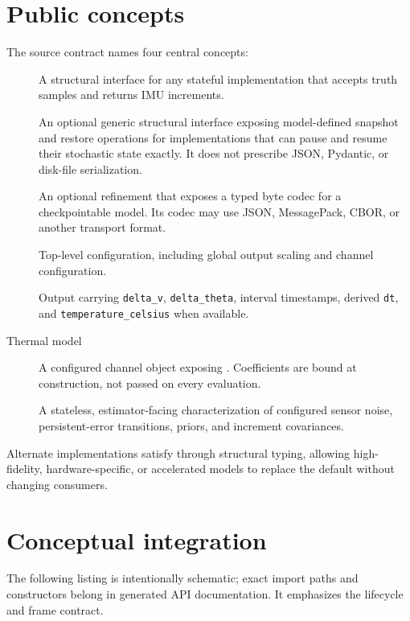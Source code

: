 \documentclass[11pt,oneside,headings=big]{scrreprt}
\newcommand{\field}[1]{\texttt{#1}}
\begin{document}
    \section{Public concepts}
    The source contract names four central concepts:
    \begin{description}
        \item[]
        A structural interface for any stateful implementation that accepts truth
        samples and returns IMU increments.
        \item[]
        An optional generic structural interface exposing model-defined snapshot and
        restore operations for implementations that can pause and resume their
        stochastic state exactly. It does not prescribe JSON, Pydantic, or disk-file serialization.
        \item[]
        An optional refinement that exposes a typed byte codec for a checkpointable
        model. Its codec may use JSON, MessagePack, CBOR, or another transport format.
        \item[]
        Top-level configuration, including global output scaling and channel
        configuration.
        \item[]
        Output carrying \field{delta\_v}, \field{delta\_theta}, interval timestamps,
        derived \field{dt}, and \field{temperature\_celsius} when available.
        \item[Thermal model]
        A configured channel object exposing
        . Coefficients are bound at
        construction, not passed on every evaluation.
        \item[]
        A stateless, estimator-facing characterization of configured sensor noise,
        persistent-error transitions, priors, and increment covariances.
    \end{description}
    Alternate implementations satisfy  through structural
    typing, allowing high-fidelity, hardware-specific, or accelerated models to
    replace the default without changing consumers.


    \section{Conceptual integration}
    The following listing is intentionally schematic; exact import paths and
    constructors belong in generated API documentation. It emphasizes the lifecycle
    and frame contract.
\end{document}
